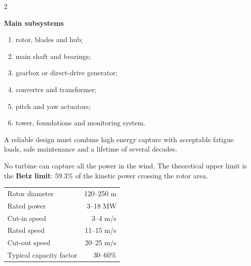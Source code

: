 \begin{multicols}{2}
\begin{engineeringfocus}
\textbf{Main subsystems}
\begin{enumerate}[leftmargin=*,itemsep=1pt]
\item rotor, blades and hub;
\item main shaft and bearings;
\item gearbox or direct-drive generator;
\item converter and transformer;
\item pitch and yaw actuators;
\item tower, foundations and monitoring system.
\end{enumerate}
A reliable design must combine high energy capture with acceptable fatigue loads, safe maintenance and a lifetime of several decades.
\end{engineeringfocus}

\begin{tcolorbox}[title=\sffamily\bfseries Did You Know?,colback=yellow!10,colframe=ECOrange]
No turbine can capture all the power in the wind. The theoretical upper limit is the \textbf{Betz limit}: 59.3\% of the kinetic power crossing the rotor area.
\end{tcolorbox}

\begin{tcolorbox}[title=\sffamily\bfseries Key Figures,colback=ECLightBlue,colframe=ECBlue]
\begin{tabularx}{\linewidth}{@{}Xr@{}}
Rotor diameter & 120--250 m\\
Rated power & 3--18 MW\\
Cut-in speed & 3--4 m/s\\
Rated speed & 11--15 m/s\\
Cut-out speed & 20--25 m/s\\
Typical capacity factor & 30--60\%
\end{tabularx}
\end{tcolorbox}

\columnbreak

\begin{tcolorbox}[title=\sffamily\bfseries Wind-turbine architecture,colback=white,colframe=ECBlue]
\centering
{}
\end{tcolorbox}


\end{multicols}
